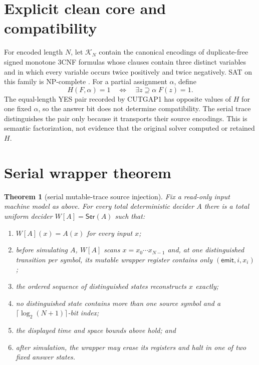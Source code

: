 \documentclass[11pt]{article}
\newtheorem{theorem}{Theorem}
\begin{document}
\section{Explicit clean core and compatibility}

For encoded length $N$, let $\mathcal K_N$ contain the canonical encodings of
duplicate-free signed monotone $3$CNF formulas whose clauses contain three
distinct variables and in which every variable occurs twice positively and
twice negatively.  SAT on this family is NP-complete \cite{docker}.  For a
partial assignment $\alpha$, define
\[
 H(F,\alpha)=1\quad\Longleftrightarrow\quad
 \exists z\supseteq\alpha\;F(z)=1.
\]
The equal-length YES pair recorded by CUTGAP1 has opposite values of $H$ for
one fixed $\alpha$, so the answer bit does not determine compatibility.  The
serial trace distinguishes the pair only because it transports their source
encodings.  This is semantic factorization, not evidence that the original
solver computed or retained $H$.

\section{Serial wrapper theorem}

\begin{theorem}[serial mutable-trace source injection]
Fix a read-only input machine model as above.  For every total deterministic
decider $A$ there is a total uniform decider $W[A]=\mathsf{Ser}(A)$ such that:
\begin{enumerate}[leftmargin=*]
\item $W[A](x)=A(x)$ for every input $x$;
\item before simulating $A$, $W[A]$ scans $x=x_0\cdots x_{N-1}$ and, at one
distinguished transition per symbol, its mutable wrapper register contains
only $(\mathsf{emit},i,x_i)$;
\item the ordered sequence of distinguished states reconstructs $x$ exactly;
\item no distinguished state contains more than one source symbol and a
$\lceil\log_2(N+1)\rceil$-bit index;
\item the displayed time and space bounds above hold; and
\item after simulation, the wrapper may erase its registers and halt in one
of two fixed answer states.
\end{enumerate}
\end{theorem}
\end{document}
